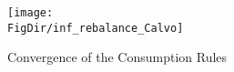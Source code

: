 \hypertarget{inf_rebalance_Calvo}{}
\begin{figure}[tbp]
\centerline{\texttt{[image: \\FigDir/inf\_rebalance\_Calvo]}}
\caption{Convergence of the Consumption Rules}
\label{fig:inf_rebalance_Calvo}
\end{figure}